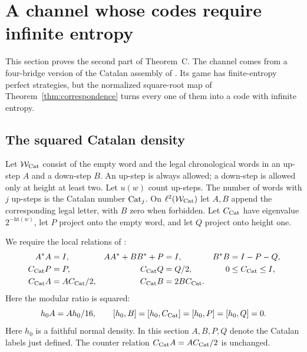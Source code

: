\section{A channel whose codes require infinite entropy}\label{sec:catalan}
This section proves the second part of Theorem~C. The channel comes from a four-bridge version of the Catalan assembly of \cite{Entropy}. Its game has finite-entropy perfect strategies, but the normalized square-root map of Theorem~\ref{thm:correspondence} turns every one of them into a code with infinite entropy.

\subsection{The squared Catalan density}
Let $\mathcal W_{\rm Cat}$ consist of the empty word and the legal chronological words in an up-step $A$ and a down-step $B$. An up-step is always allowed; a down-step is allowed only at height at least two. Let $u(w)$ count up-steps. The number of words with $j$ up-steps is the Catalan number $\operatorname{Cat}_j$. On $\ell^2(\mathcal W_{\rm Cat})$ let $A,B$ append the corresponding legal letter, with $B$ zero when forbidden. Let $C_{\mathrm{Cat}}$ have eigenvalue $2^{-\mathrm{ht}(w)}$, let $P$ project onto the empty word, and let $Q$ project onto height one.

We require the local relations of \cite[Section~3]{Entropy}:
\begin{align}
 A^*A&=I,& AA^*+BB^*+P&=I,& B^*B&=I-P-Q,\label{eq:Catlocal}\\
 C_{\mathrm{Cat}} P&=P,& C_{\mathrm{Cat}} Q&=Q/2,&0&\leq C_{\mathrm{Cat}}\leq I,\label{eq:Catboundary}\\
 C_{\mathrm{Cat}} A&=AC_{\mathrm{Cat}}/2,& C_{\mathrm{Cat}} B&=2BC_{\mathrm{Cat}}.&&\label{eq:Catcounter}
\end{align}
Here the modular ratio is squared:
\begin{equation}\label{eq:Catsquared}
 h_0 A=Ah_0/16,\qquad[h_0,B]=[h_0,C_{\mathrm{Cat}}]=[h_0,P]=[h_0,Q]=0.
\end{equation}
Here $h_0$ is a faithful normal density. In this section $A,B,P,Q$ denote the Catalan labels just defined. The counter relation $C_{\mathrm{Cat}} A=AC_{\mathrm{Cat}}/2$ is unchanged.

